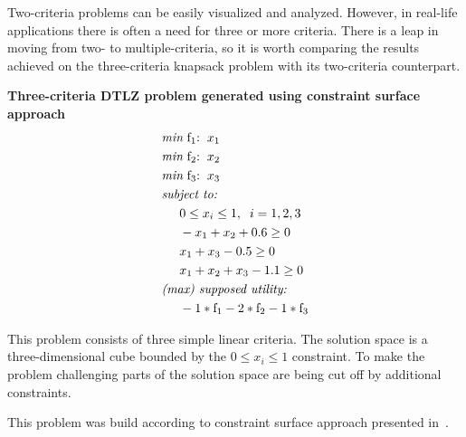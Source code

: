 \begin{description}
    Two-criteria problems can be easily visualized and analyzed. However, in
    real-life applications there is often a need for three or more
   criteria. There is a leap in moving from two- to multiple-criteria, so it
    is worth comparing the results achieved on the three-criteria knapsack
    problem with its two-criteria counterpart.

  \item{\textbf{Three-criteria DTLZ problem generated using constraint surface
    approach}}
    \begin{align*}
      & \textit{min}\text{ f$_1$:} \hspace{0.2cm} x_1 \\
      & \textit{min}\text{ f$_2$:} \hspace{0.2cm} x_2 \\
      & \textit{min}\text{ f$_3$:} \hspace{0.2cm} x_3 \\
      & \textit{subject to:} \\
      & \hspace{0.5cm} 0 \le x_i \le 1, \hspace{0.2cm} i = 1, 2, 3 \\
      & \hspace{0.5cm} -x_1 + x_2 + 0.6 \ge 0 \\
      & \hspace{0.5cm} x_1 + x_3 - 0.5 \ge 0 \\
      & \hspace{0.5cm} x_1 + x_2 + x_3 - 1.1 \ge 0 \\
      & \textit{(max) supposed utility:} \\
      & \hspace{0.5cm} -1 * \text{f}_1 - 2 * \text{f}_2 - 1 * \text{f}_3
    \end{align*}

    This problem consists of three simple linear criteria. The solution space
    is a three-dimensional cube bounded by the $0 \le x_i \le 1$ constraint. To
    make the problem challenging parts of the solution space are being cut off
    by additional constraints.

    This problem was build according to constraint surface approach presented
    in~\cite{DTL+02}.


\end{description}
